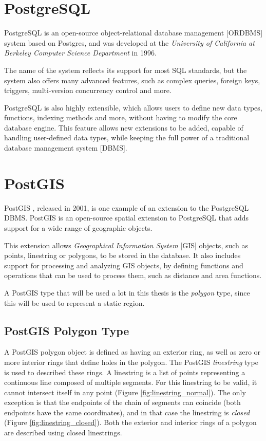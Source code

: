 
\section{PostgreSQL}
\label{section:postgresql}

PostgreSQL \cite{postgresql} is an open-source object-relational database management [ORDBMS] system based on Postgres, and was developed at the \textit{University of California at  Berkeley Computer Science Department} in 1996.

The name of the system reflects its support for most SQL standards, but the system also offers many advanced features, such as complex queries, foreign keys, triggers, multi-version concurrency control and more. 

PostgreSQL is also highly extensible, which allows users to define new data types, functions, indexing methods and more, without having to modify the core database engine. This feature allows new extensions to be added, capable of handling user-defined data types, while keeping the full power of a traditional database management system [DBMS].

\section{PostGIS}
\label{section:postgis}

PostGIS \cite{postgis}, released in 2001, is one example of an extension to the PostgreSQL DBMS. PostGIS is an open-source spatial extension to PostgreSQL that adds support for a wide range of geographic objects. 

This extension allows \textit{Geographical Information System} [GIS] objects, such as points, linestring or polygons, to be stored in the database. It also includes support for processing and analyzing GIS objects, by defining functions and operations that can be used to process them, such as distance and area functions.

A PostGIS type that will be used a lot in this thesis is the \textit{polygon} type, since this will be used to represent a static region. 

\subsection{PostGIS Polygon Type}
\label{section:postgis_polygon}

A PostGIS polygon object is defined as having an exterior ring, as well as zero or more interior rings that define holes in the polygon. The PostGIS \textit{linestring} type is used to described these rings. A linestring
is a list of points representing a continuous line composed of multiple segments. For this linestring to be valid, it cannot intersect itself in any point (Figure \ref{fig:linestring_normal}). The only exception is that the endpoints of the chain of segments can coincide (both endpoints have the same coordinates), and in that case the linestring is \textit{closed} (Figure \ref{fig:linestring_closed}). Both the exterior and interior rings of a polygon are described using closed linestrings.

